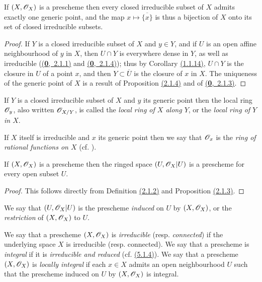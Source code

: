 \begin{prop}[2.1.5]
\label{prop-1.2.1.5}
If $(X,\mathscr{O}_X)$ is a prescheme then every closed
irreducible subset of $X$ admits exactly one generic point, and the map
$x\mapsto\overline{\{x\}}$ is thus a bijection of $X$ onto its set of closed
irreducible subsets.
\end{prop}

\begin{proof}
\label{proof-prop-1.2.1.5}
If $Y$ is a closed irreducible subset of $X$ and $y\in Y$, and if $U$
is an open affine neighbourhood of $y$ in $X$, then $U\cap Y$ is everywhere
dense in $Y$, as well as irreducible (\hyperref[env-0.2.1.1]{(\textbf{0},~2.1.1)} and \hyperref[env-0.2.1.4]{(\textbf{0},~2.1.4)}); thus by
Corollary \hyperref[cor-1.1.1.14]{(1.1.14)}, $U\cap Y$ is the closure in $U$ of a point $x$, and then
$Y\subset\overline{U}$ is the closure of $x$ in $X$. The uniqueness of the
generic point of $X$ is a result of Proposition \hyperref[prop-1.2.1.4]{(2.1.4)} and of \hyperref[env-0.2.1.3]{(\textbf{0},~2.1.3)}.
\end{proof}

\begin{env}[2.1.6]
\label{env-1.2.1.6}
If $Y$ is a closed irreducible subset of $X$ and $y$ its
generic point then the local ring $\mathscr{O}_y$, also written $\mathscr{O}_{X/Y}$, is called the
{\em local ring of $X$ along $Y$}, or the {\em local ring of $Y$ in $X$}.

If $X$ itself is irreducible and $x$ its generic point then we say that
$\mathscr{O}_x$ is the {\em ring of rational functions on $X$} (cf. ).
\end{env}

\begin{prop}[2.1.7]
\label{prop-1.2.1.7}
If $(X,\mathscr{O}_X)$ is a prescheme then the ringed
space $(U,\mathscr{O}_X|U)$ is a prescheme for every open subset $U$.
\end{prop}

\begin{proof}
\label{proof-prop-1.2.1.7}
This follows directly from Definition \hyperref[defn-1.2.1.2]{(2.1.2)} and Proposition \hyperref[prop-1.2.1.3]{(2.1.3)}.
\end{proof}

We say that $(U,\mathscr{O}_X|U)$ is the prescheme {\em induced} on $U$ by
$(X,\mathscr{O}_X)$, or the {\em restriction} of $(X,\mathscr{O}_X)$ to $U$.

\begin{env}[2.1.8]
\label{env-1.2.1.8}
We say that a prescheme $(X,\mathscr{O}_X)$ is {\em irreducible}
(resp. {\em connected}) if the underlying space $X$ is irreducible (resp.
connected). We say that a prescheme is {\em integral} if it is
{\em irreducible and reduced} (cf. \hyperref[env-1.5.1.4]{(5.1.4)}). We say that a prescheme
$(X,\mathscr{O}_X)$ is {\em locally integral} if each $x\in X$ admits an open
neighbourhood $U$ such that the prescheme induced on $U$ by $(X,\mathscr{O}_X)$ is integral.
\end{env}


